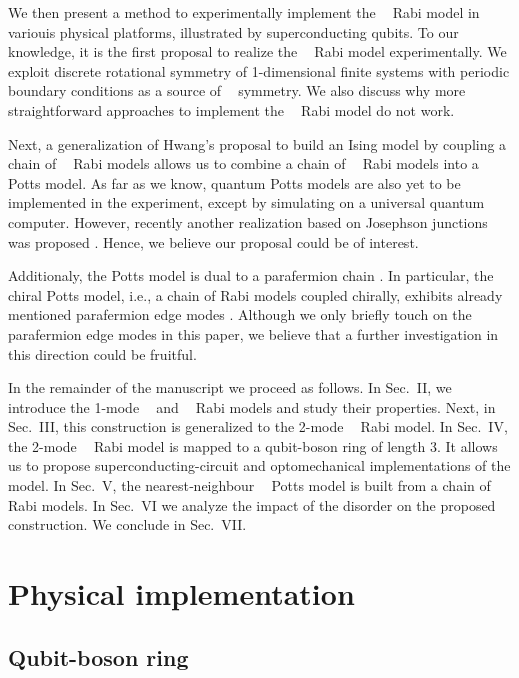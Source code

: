 \documentclass[reprint, aps, prx, amsmath, amssymb, longbibliography, superscriptaddress]{revtex4-2}
\DeclareMathOperator{\Zn}{\mathbb{Z}_n}
\DeclareMathOperator{\Zthree}{\mathbb{Z}_3}
\DeclareMathOperator{\Ztwo}{\mathbb{Z}_2}
\begin{document}
We then present a method to experimentally implement the $\Zthree$ Rabi model in variouis physical platforms, illustrated by superconducting qubits. To our knowledge, it is the first proposal to realize the $\Zthree$ Rabi model experimentally. We exploit discrete rotational symmetry of 1-dimensional finite systems with periodic boundary conditions as a source of $\Zn$ symmetry. We also discuss why more straightforward approaches to implement the $\Zn$ Rabi model do not work.

Next, a generalization of Hwang's proposal to build an Ising model by coupling a chain of $\Ztwo$ Rabi models \cite{hwang_largescale_2013} allows us to combine a chain of $\Zthree$ Rabi models into a $\Zthree$ Potts model. As far as we know, quantum Potts models are also yet to be implemented in the experiment, except by simulating on a universal quantum computer. However, recently another realization based on Josephson junctions was proposed \cite{wauters_engineering_2024}. Hence, we believe our proposal could be of interest. 

Additionaly, the Potts model is dual to a parafermion chain \cite{fradkin_disorder_1980}. In particular, the chiral Potts model, i.e., a chain of Rabi models coupled chirally, exhibits already mentioned parafermion edge modes \cite{fendley_free_2013,fendley_parafermionic_2012}. Although we only briefly touch on the parafermion edge modes in this paper, we believe that a further investigation in this direction could be fruitful.

In the remainder of the manuscript we proceed as follows. In Sec.~II, we introduce the 1-mode $\Zn$ and $\Zthree$ Rabi models and study their properties. Next, in Sec.~III, this construction is generalized to the 2-mode $\Zthree$ Rabi model. In Sec.~IV, the 2-mode $\Zthree$ Rabi model is mapped to a qubit-boson ring of length 3. It allows us to propose superconducting-circuit and optomechanical implementations of the model. In Sec.~V,  the nearest‑neighbour $\Zthree$ Potts model is built from a chain of $\Zthree$ Rabi models. In Sec.~VI we analyze the impact of the disorder on the proposed construction. We conclude in Sec.~VII.



\section{Physical implementation}


\subsection{Qubit-boson ring}
\label{physical-implementation}
\end{document}
